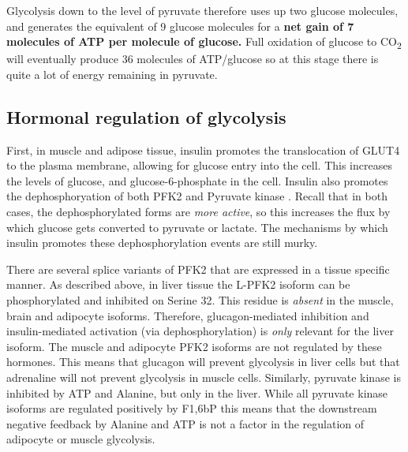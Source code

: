 \documentclass{tufte-handout}
\begin{document}
Glycolysis down to the level of pyruvate therefore uses up two glucose molecules, and generates the equivalent of 9 glucose molecules for a \textbf{net gain of 7 molecules of ATP per molecule of glucose.}  Full oxidation of glucose to CO\textsubscript{2} will eventually produce 36 molecules of ATP/glucose so at this stage there is quite a lot of energy remaining in pyruvate.

\subsection{Hormonal regulation of glycolysis}

  First, in muscle and adipose tissue, insulin promotes the translocation of GLUT4 to the plasma membrane, allowing for glucose entry into the cell.  This increases the levels of glucose, and glucose-6-phosphate in the cell.  Insulin also promotes the dephosphoryation of both PFK2 and Pyruvate kinase \citep{PROBST1985}. Recall that in both cases, the dephosphorylated forms are \emph{more active}, so this increases the flux by which glucose gets converted to pyruvate or lactate.  The mechanisms by which insulin promotes these dephosphorylation events are still murky.

  There are several splice variants of PFK2 that are expressed in a tissue specific manner.  As described above, in liver tissue the L-PFK2 isoform can be phosphorylated and inhibited on Serine 32.  This residue is \emph{absent} in the muscle, brain and adipocyte isoforms.  Therefore, glucagon-mediated inhibition and insulin-mediated activation (via dephosphorylation) is \emph{only} relevant for the liver isoform.  The muscle and adipocyte PFK2 isoforms are not regulated by these hormones.  This means that glucagon will prevent glycolysis in liver cells but that adrenaline will not prevent glycolysis in muscle cells.  Similarly, pyruvate kinase is inhibited by ATP and Alanine, but only in the liver.  While all pyruvate kinase isoforms are regulated positively by F1,6bP this means that the downstream negative feedback by Alanine and ATP is not a factor in the regulation of adipocyte or muscle glycolysis.  
\end{document}
